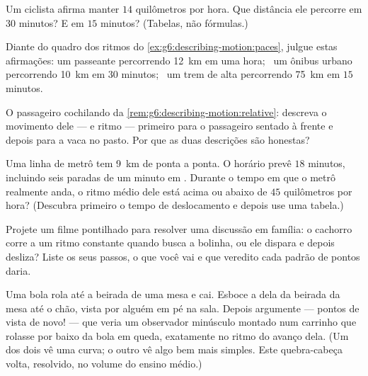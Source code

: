 \begin{exercise}[$\star$]\label{exo:g6:describing-motion:7}
Um ciclista afirma manter $14$ quilômetros por hora. Que distância
ele percorre em $30$ minutos? E em $15$ minutos? (Tabelas, não
fórmulas.)
\end{exercise}

\begin{exercise}[$\star$]\label{exo:g6:describing-motion:8}
Diante do quadro dos ritmos do
\cref{ex:g6:describing-motion:paces}, julgue estas afirmações: um
passeante percorrendo \qty{12}{km} em uma hora; \ um ônibus urbano
percorrendo \qty{10}{km} em $30$ minutos; \ um trem de alta
 percorrendo \qty{75}{km} em $15$ minutos.
\end{exercise}

\begin{exercise}[$\star\star$]\label{exo:g6:describing-motion:9}
O passageiro cochilando da
\cref{rem:g6:describing-motion:relative}: descreva o movimento dele
---  e ritmo --- primeiro para o passageiro sentado à
frente e depois para a vaca no pasto. Por que as duas descrições são
honestas?
\end{exercise}

\begin{exercise}[$\star\star$]\label{exo:g6:describing-motion:10}
Uma linha de metrô tem \qty{9}{km} de ponta a ponta. O horário
prevê $18$ minutos, incluindo seis paradas de um minuto em .
Durante o tempo em que o metrô realmente anda, o ritmo médio dele
está acima ou abaixo de $45$ quilômetros por hora? (Descubra primeiro
o tempo de deslocamento e depois use uma tabela.)
\end{exercise}

\begin{exercise}[$\star\star$]\label{exo:g6:describing-motion:11}
Projete um filme pontilhado para resolver uma discussão em família: o
cachorro corre a um ritmo constante quando busca a bolinha, ou ele
dispara e depois desliza? Liste os seus passos, o que você vai 
e que veredito cada padrão de pontos daria.
\end{exercise}

\begin{exercise}[$\star\star\star$]\label{exo:g6:describing-motion:12}
Uma bola rola até a beirada de uma mesa e cai. Esboce a 
dela da beirada da mesa até o chão, vista por alguém em pé na sala.
Depois argumente --- pontos de vista de novo! --- que 
veria um observador minúsculo montado num carrinho que rolasse por
baixo da bola em queda, exatamente no ritmo do avanço dela. (Um dos
dois vê uma curva; o outro vê algo bem mais simples. Este
quebra-cabeça volta, resolvido, no volume do ensino médio.)
\end{exercise}

